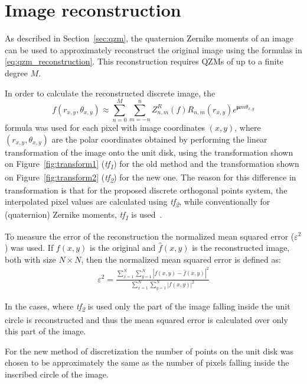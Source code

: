 \section{Image reconstruction}
As described in Section~\ref{sec:qzm}, the quaternion Zernike moments of an image can be used to approximately reconstruct the original image using the formulas in \eqref{eq:qzm_reconstruction}. This reconstruction requires QZMs of up to a finite degree $M$.

In order to calculate the reconstructed discrete image, the 
$$
f(r_{x,y},\theta_{x,y}) \approx \sum_{n=0}^{M}\sum_{m=-n}^{n}Z_{n,m}^R(f)R_{n,m}(r_{x,y})e^{\bm{\mu}m\theta_{x,y}}
$$
formula was used for each pixel with image coordinates $(x,y)$, where $(r_{x,y},\theta_{x,y})$ are the polar coordinates obtained by performing the linear transformation of the image onto the unit disk, using the transformation shown on Figure~\ref{fig:transform1} (\textit{tf\textsubscript{1}}) for the old method and the transformation shown on Figure~\ref{fig:transform2} (\textit{tf\textsubscript{2}}) for the new one. The reason for this difference in transformation is that for the proposed discrete orthogonal points system, the interpolated pixel values are calculated using \textit{tf\textsubscript{2}}, while conventionally for (quaternion) Zernike moments, \textit{tf\textsubscript{1}} is used~\cite{qzmi}.

To measure the error of the reconstruction the normalized mean squared error ($\varepsilon^2$) was used. If $f(x,y)$ is the original and $\widehat{f}(x,y)$ is the reconstructed image, both with size $N \times N$, then the normalized mean squared error is defined as:
\begin{gather*}
    \varepsilon^2 = \frac{\displaystyle \sum_{x=1}^N\sum_{y=1}^N \left|f(x,y) - \widehat{f}(x,y)\right|^2}{\displaystyle \sum_{x=1}^N\sum_{y=1}^N \left|f(x,y)\right|^2}
\end{gather*}

In the cases, where \textit{tf\textsubscript{2}} is used only the part of the image falling inside the unit circle is reconstructed and thus the mean squared error is calculated over only this part of the image.

For the new method of discretization the number of points on the unit disk was chosen to be approximately the same as the number of pixels falling inside the inscribed circle of the image. 

